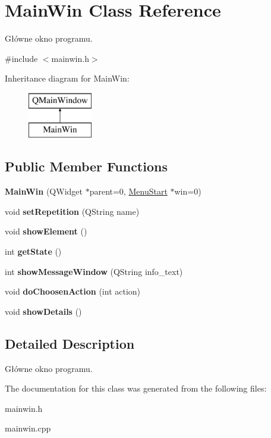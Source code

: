 \hypertarget{class_main_win}{}\section{Main\+Win Class Reference}
\label{class_main_win}


Główne okno programu.  




{\ttfamily \#include $<$mainwin.\+h$>$}

Inheritance diagram for Main\+Win\+:\begin{figure}[H]
\begin{center}
\leavevmode
\includegraphics[height=2.000000cm]{class_main_win}
\end{center}
\end{figure}
\subsection*{Public Member Functions}
\begin{DoxyCompactItemize}
\item 
\mbox{\label{class_main_win_a6b5f1fb3c79f705570e57c1838ccb2e9}} 
{\bfseries Main\+Win} (Q\+Widget $\ast$parent=0, \mbox{\hyperlink{class_menu_start}{Menu\+Start}} $\ast$win=0)
\item 
\mbox{\label{class_main_win_a927f5e011ea2c3eef5a112173c693029}} 
void {\bfseries set\+Repetition} (Q\+String name)
\item 
\mbox{\label{class_main_win_aed160d223350e6b9c0a74c4be1108b09}} 
void {\bfseries show\+Element} ()
\item 
\mbox{\label{class_main_win_ade439601c33cfd33472ea9c9f87017db}} 
int {\bfseries get\+State} ()
\item 
\mbox{\label{class_main_win_aa3280cf1c23f3b578a0acb486a23d989}} 
int {\bfseries show\+Message\+Window} (Q\+String info\+\_\+text)
\item 
\mbox{\label{class_main_win_ad23b2f0e0498b3d42b6ac35091cc771f}} 
void {\bfseries do\+Choosen\+Action} (int action)
\item 
\mbox{\label{class_main_win_a944961976d6b9b6692f6e09afb20edee}} 
void {\bfseries show\+Details} ()
\end{DoxyCompactItemize}


\subsection{Detailed Description}
Główne okno programu. 

The documentation for this class was generated from the following files\+:\begin{DoxyCompactItemize}
\item 
mainwin.\+h\item 
mainwin.\+cpp\end{DoxyCompactItemize}

